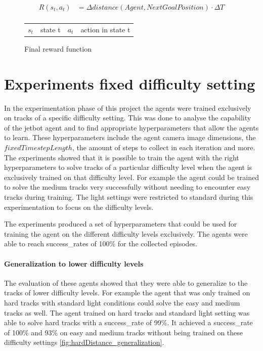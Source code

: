 \begin{figure}
    \centering
    \begin{align*}
         R(s_t,a_t) &= \Delta distance(Agent, NextGoalPosition) \cdot \Delta T \nonumber \\
    \end{align*}
    \caption{Final reward function}
    \begin{tabular}{r@{: }l r@{: }l}
    $s_t$& state t & $a_t$& action in state t 
    \end{tabular}
    \label{fig:final_reward_function}
\end{figure}


\section{Experiments fixed difficulty setting}
\label{cha:experiment_fixed_difficulty}

In the experimentation phase of this project the agents were trained exclusively on tracks of a specific difficulty setting. This was done to analyse the capability of the jetbot agent and to find appropriate hyperparameters that allow the agents to learn. These hyperparameters include the agent camera image dimensions, the $fixedTimestepLength$, the amount of steps to collect in each iteration and more. 
The experiments showed that it is possible to train the agent with the right hyperparameters to solve tracks of a particular difficulty level when the agent is exclusively trained on that difficulty level. For example the agent could be trained to solve the medium tracks very successfully without needing to encounter easy tracks during training. The light settings were restricted to standard during this experimentation to focus on the difficulty levels.

The experiments produced a set of hyperparameters that could be used for training the agent on the different difficulty levels exclusively. The agents were able to reach success\_rates of 100\% for the collected episodes.

\paragraph{Generalization to lower difficulty levels} The evaluation of these agents showed that they were able to generalize to the tracks of lower difficulty levels. For example the agent that was only trained on hard tracks with standard light conditions could solve the easy and medium tracks as well. The agent trained on hard tracks and standard light setting was able to solve hard tracks with a success\_rate of 99\%. It achieved a success\_rate of 100\% and 93\% on easy and medium tracks without being trained on these difficulty settings \ref{fig:hardDistance_generalization}. 

